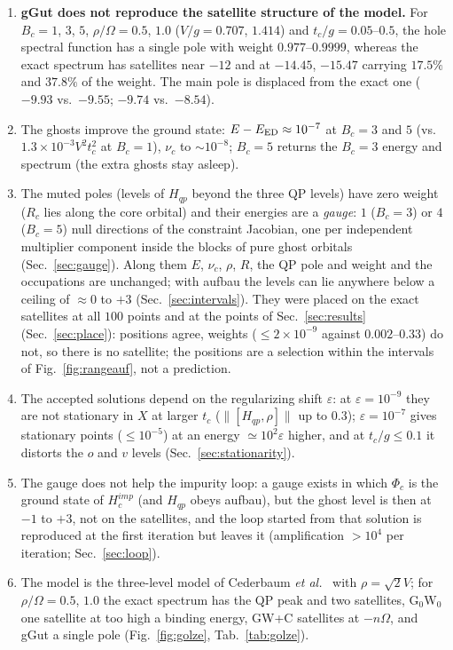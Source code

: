 \documentclass[11pt]{article}
\begin{document}
\begin{enumerate}
\item \textbf{gGut does not reproduce the satellite structure of the model.} For $B_c=1$, $3$, $5$, $\rho/\Omega=0.5$, $1.0$ ($V/g=0.707$, $1.414$) and $t_c/g=0.05$--$0.5$, the hole spectral function has a single pole with weight $0.977$--$0.9999$, whereas the exact spectrum has satellites near $-12$ and at $-14.45$, $-15.47$ carrying $17.5\%$ and $37.8\%$ of the weight.
The main pole is displaced from the exact one ($-9.93$ vs.\ $-9.55$; $-9.74$ vs.\ $-8.54$).
\item The ghosts improve the ground state: $E-E_{\rm ED}\approx10^{-7}$ at $B_c=3$ and $5$ (vs.\ $1.3\times10^{-3}V^2t_c^2$ at $B_c=1$), $\nu_c$ to $\sim10^{-8}$; $B_c=5$ returns the $B_c=3$ energy and spectrum (the extra ghosts stay asleep).
\item The muted poles (levels of $H_{qp}$ beyond the three QP levels) have zero weight ($R_c$ lies along the core orbital) and their energies are a \emph{gauge}: $1$ ($B_c=3$) or $4$ ($B_c=5$) null directions of the constraint Jacobian, one per independent multiplier component inside the blocks of pure ghost orbitals (Sec.~\ref{sec:gauge}).
Along them $E$, $\nu_c$, $\rho$, $R$, the QP pole and weight and the occupations are unchanged; with aufbau the levels can lie anywhere below a ceiling of $\approx0$ to $+3$ (Sec.~\ref{sec:intervals}). They were placed on the exact satellites at all $100$ points and at the points of Sec.~\ref{sec:results} (Sec.~\ref{sec:place}): positions agree, weights ($\le2\times10^{-9}$ against $0.002$--$0.33$) do not, so there is no satellite; the positions are a selection within the intervals of Fig.~\ref{fig:rangeauf}, not a prediction.
\item The accepted solutions depend on the regularizing shift $\varepsilon$: at $\varepsilon=10^{-9}$ they are not stationary in $X$ at larger $t_c$ ($\|[H_{qp},\rho]\|$ up to $0.3$); $\varepsilon=10^{-7}$ gives stationary points ($\le10^{-5}$) at an energy $\simeq10^2\varepsilon$ higher, and at $t_c/g\le0.1$ it distorts the $o$ and $v$ levels (Sec.~\ref{sec:stationarity}).
\item The gauge does not help the impurity loop: a gauge exists in which $\Phi_c$ is the ground state of $H^{imp}_c$ (and $H_{qp}$ obeys aufbau), but the ghost level is then at $-1$ to $+3$, not on the satellites, and the loop started from that solution is reproduced at the first iteration but leaves it (amplification $>10^4$ per iteration; Sec.~\ref{sec:loop}).
\item The model is the three-level model of Cederbaum \emph{et al.}~\cite{Cederbaum1980} with $\rho=\sqrt2V$; for $\rho/\Omega=0.5$, $1.0$ the exact spectrum has the QP peak and two satellites, G$_0$W$_0$ one satellite at too high a binding energy, GW+C satellites at $-n\Omega$, and gGut a single pole (Fig.~\ref{fig:golze}, Tab.~\ref{tab:golze}).
\end{enumerate}
\end{document}

